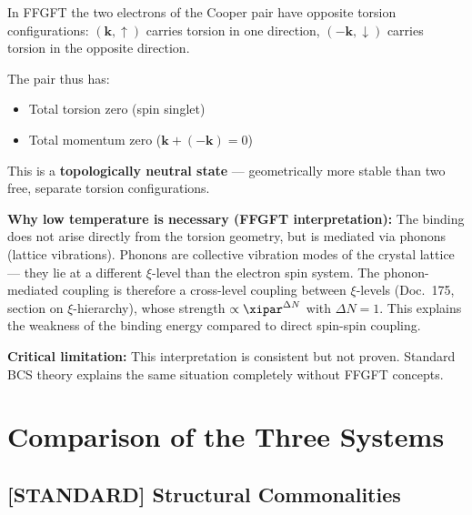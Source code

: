 \begin{foundation}
In FFGFT the two electrons of the Cooper pair have
opposite torsion configurations:
$(\mathbf{k}, \uparrow)$ carries torsion in one direction,
$(-\mathbf{k}, \downarrow)$ carries torsion in the opposite direction.

The pair thus has:
\begin{itemize}
  \item Total torsion zero (spin singlet)
  \item Total momentum zero ($\mathbf{k} + (-\mathbf{k}) = 0$)
\end{itemize}

This is a \textbf{topologically neutral state} ---
geometrically more stable than two free, separate torsion configurations.

\textbf{Why low temperature is necessary (FFGFT interpretation):}
The binding does not arise directly from the torsion geometry,
but is mediated via phonons (lattice vibrations).
Phonons are collective vibration modes of the crystal lattice ---
they lie at a different $\xi$-level than the electron spin system.
The phonon-mediated coupling is therefore a
cross-level coupling between $\xi$-levels
(Doc.~175, section on $\xi$-hierarchy),
whose strength $\propto \xipar^{\Delta N}$ with $\Delta N = 1$.
This explains the weakness of the binding energy
compared to direct spin-spin coupling.

\textbf{Critical limitation:}
This interpretation is consistent but not proven.
Standard BCS theory explains the same situation
completely without FFGFT concepts.
\end{foundation}

\section{Comparison of the Three Systems}
\label{sec:comparison}

\subsection{[STANDARD] Structural Commonalities}

